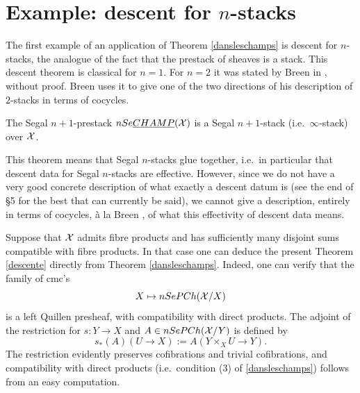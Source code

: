 %

\clearpage
\section{Example: descent for \texorpdfstring{$n$}{n}-stacks}

\label{exemplepage}

The first example of an application of Theorem \ref{dansleschamps} is descent
for $n$-stacks, the analogue of the fact that the prestack of sheaves is a
stack. This descent theorem is classical for $n=1$. For $n=2$ it was stated by
Breen in \cite{Breen}, without proof. Breen uses it to give one of the two
directions of his description of $2$-stacks in terms of cocycles.


\begin{theorem}
\label{descente}
The Segal $n+1$-prestack $nSe\underline{CHAMP}({\cal X} )$ is a Segal $n+1$-stack
(i.e.\ $\infty$-stack) over ${\cal X}$.
\end{theorem}

This theorem means that Segal $n$-stacks glue together, i.e.\ in particular
that descent data for Segal $n$-stacks are effective. However, since we do not
have a very good concrete description of what exactly a descent datum is (see
the end of \S5 for the best that can currently be said), we cannot give a
description, entirely in terms of cocycles, à la Breen \cite{Breen}, of what
this effectivity of descent data means.


Suppose that ${\cal X}$ admits fibre products and has sufficiently many disjoint
sums compatible with fibre products. In that case one can deduce the present
Theorem \ref{descente} directly from Theorem \ref{dansleschamps}.
Indeed, one can verify that the family of cmc's
$$
X\mapsto nSePCh({\cal X} /X)
$$
is a left Quillen presheaf, with compatibility with direct products. The
adjoint of the restriction for $s: Y\rightarrow X$ and $A\in
nSePCh({\cal X} /Y)$ is defined by
$$
s_{\ast}(A)(U\rightarrow X):= A(Y\times _XU\rightarrow Y).
$$
The restriction evidently preserves cofibrations and trivial cofibrations, and
compatibility with direct products (i.e.\ condition (3) of
\ref{dansleschamps}) follows from an easy computation.

